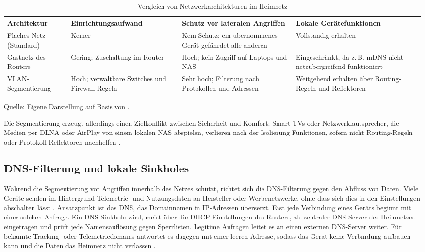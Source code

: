 \begin{table}[htbp]
  \centering
  \caption{Vergleich von Netzwerkarchitekturen im Heimnetz}
  \label{tab:netzwerkarchitektur}
  \footnotesize
  \setlength{\tabcolsep}{4pt}
  \renewcommand{\arraystretch}{1.2}
  \begin{tabularx}{\textwidth}{@{}>{\raggedright\arraybackslash}p{2.6cm}
      >{\raggedright\arraybackslash}p{3.3cm}
      >{\raggedright\arraybackslash}X
      >{\raggedright\arraybackslash}X@{}}
    \hline
    \textbf{Architektur} & \textbf{Einrichtungs\-aufwand}
      & \textbf{Schutz vor lateralen Angriffen}
      & \textbf{Lokale Gerätefunktionen} \\
    \hline
    Flaches Netz (Standard) & Keiner
      & Kein Schutz; ein übernommenes Gerät gefährdet alle anderen
      & Vollständig erhalten \\
    Gastnetz des Routers & Gering; Zuschaltung im Router
      & Hoch; kein Zugriff auf Laptops und NAS
      & Eingeschränkt, da z.\,B. mDNS nicht netzübergreifend funktioniert \\
    VLAN-Segmentierung & Hoch; verwaltbare Switches und Firewall-Regeln
      & Sehr hoch; Filterung nach Protokollen und Adressen
      & Weitgehend erhalten über Routing-Regeln und Reflektoren \\
    \hline
  \end{tabularx}
  \par\smallskip
  \raggedright\scriptsize
  Quelle: Eigene Darstellung auf Basis von \cite{noauthor_smarthome_nodate}.
\end{table}

Die Segmentierung erzeugt allerdings einen Zielkonflikt zwischen Sicherheit
und Komfort: Smart-TVs oder Netzwerklautsprecher, die Medien per \gls{DLNA} oder
AirPlay von einem lokalen \gls{NAS} abspielen, verlieren nach der Isolierung
Funktionen, sofern nicht Routing-Regeln oder Protokoll-Reflektoren nachhelfen \cite{noauthor_smarthome_nodate}.

\subsection{DNS-Filterung und lokale Sinkholes}
Während die Segmentierung vor Angriffen innerhalb des Netzes schützt, richtet
sich die DNS-Filterung gegen den Abfluss von Daten. Viele Geräte senden im
Hintergrund Telemetrie- und Nutzungsdaten an Hersteller oder Werbenetzwerke,
ohne dass sich dies in den Einstellungen abschalten lässt \cite{noauthor_overview_nodate, noauthor_uberblick_nodate}. 
Ansatzpunkt ist das \gls{DNS}, das Domainnamen in IP-Adressen übersetzt. Fast jede Verbindung eines Geräts
beginnt mit einer solchen Anfrage. Ein \gls{DNS}-Sinkhole wird, meist über die \gls{DHCP}-Einstellungen des
Routers, als zentraler \gls{DNS}-Server des Heimnetzes eingetragen und prüft jede
Namensauflösung gegen Sperrlisten. Legitime Anfragen leitet es an einen
externen \gls{DNS}-Server weiter. Für bekannte Tracking- oder Telemetriedomains
antwortet es dagegen mit einer leeren Adresse, sodass das Gerät keine
Verbindung aufbauen kann und die Daten das Heimnetz nicht verlassen \cite{noauthor_overview_nodate}.

